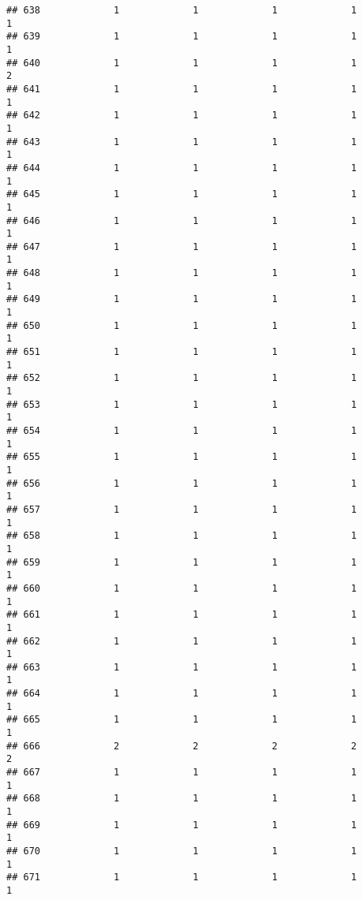 \documentclass[
]{article}
\begin{document}
\begin{verbatim}
## 638             1             1             1             1             1
## 639             1             1             1             1             1
## 640             1             1             1             1             2
## 641             1             1             1             1             1
## 642             1             1             1             1             1
## 643             1             1             1             1             1
## 644             1             1             1             1             1
## 645             1             1             1             1             1
## 646             1             1             1             1             1
## 647             1             1             1             1             1
## 648             1             1             1             1             1
## 649             1             1             1             1             1
## 650             1             1             1             1             1
## 651             1             1             1             1             1
## 652             1             1             1             1             1
## 653             1             1             1             1             1
## 654             1             1             1             1             1
## 655             1             1             1             1             1
## 656             1             1             1             1             1
## 657             1             1             1             1             1
## 658             1             1             1             1             1
## 659             1             1             1             1             1
## 660             1             1             1             1             1
## 661             1             1             1             1             1
## 662             1             1             1             1             1
## 663             1             1             1             1             1
## 664             1             1             1             1             1
## 665             1             1             1             1             1
## 666             2             2             2             2             2
## 667             1             1             1             1             1
## 668             1             1             1             1             1
## 669             1             1             1             1             1
## 670             1             1             1             1             1
## 671             1             1             1             1             1

\end{verbatim}
\end{document}
